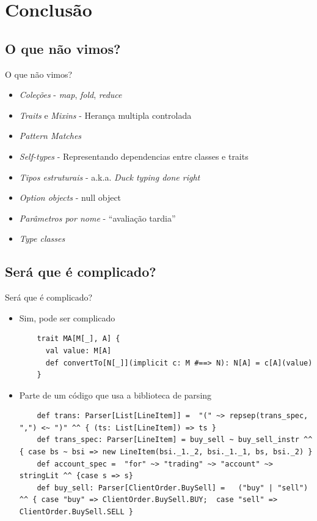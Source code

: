 \documentclass{beamer}
\begin{document}
\section{Conclusão}

\subsection{O que não vimos?}

\begin{frame}{O que não vimos?}
	\begin{itemize} %
	\item \emph{Coleções} - \emph{map}, \emph{fold}, \emph{reduce}
	\item \emph{Traits} e \emph{Mixins} - Herança multipla controlada
	\item \emph{Pattern Matches}
	\item \emph{Self-types} - Representando dependencias entre classes e traits 
	\item \emph{Tipos estruturais} - a.k.a. \emph{Duck typing done right}
	\item \emph{Option objects} - null object
	\item \emph{Parâmetros por nome} - ``avaliação tardia''
	\item \emph{Type classes} 
	
	\vfill
	\end{itemize}
\end{frame}

\subsection{Será que é complicado?}

\begin{frame}[fragile]{Será que é complicado?}
   \begin{itemize}%
	\item Sim, pode ser complicado
	\begin{lstlisting}
	trait MA[M[_], A] {
	  val value: M[A]
	  def convertTo[N[_]](implicit c: M #==> N): N[A] = c[A](value)
	}
	\end{lstlisting}
	\item Parte de um código que usa a biblioteca de parsing
	\begin{lstlisting}
	def trans: Parser[List[LineItem]] =  "(" ~> repsep(trans_spec, ",") <~ ")" ^^ { (ts: List[LineItem]) => ts }
	def trans_spec: Parser[LineItem] = buy_sell ~ buy_sell_instr ^^ { case bs ~ bsi => new LineItem(bsi._1._2, bsi._1._1, bs, bsi._2) }
	def account_spec =  "for" ~> "trading" ~> "account" ~> stringLit ^^ {case s => s}
	def buy_sell: Parser[ClientOrder.BuySell] =   ("buy" | "sell") ^^ { case "buy" => ClientOrder.BuySell.BUY;  case "sell" => ClientOrder.BuySell.SELL }
	\end{lstlisting}
\end{itemize}
\end{frame}
\end{document}

